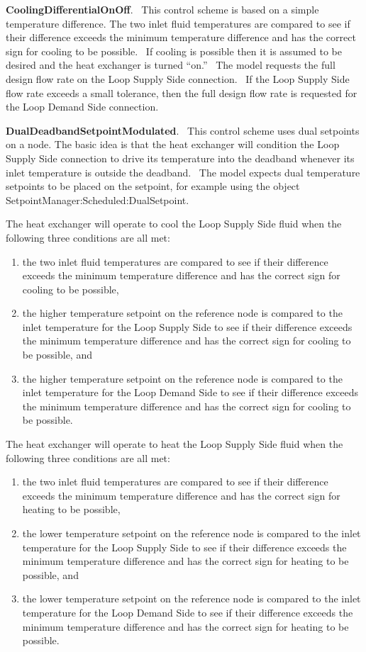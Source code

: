 \textbf{CoolingDifferentialOnOff}.~ This control scheme is based on a simple temperature difference. The two inlet fluid temperatures are compared to see if their difference exceeds the minimum temperature difference and has the correct sign for cooling to be possible.~ If cooling is possible then it is assumed to be desired and the heat exchanger is turned ``on.''~ The model requests the full design flow rate on the Loop Supply Side connection.~ If the Loop Supply Side flow rate exceeds a small tolerance, then the full design flow rate is requested for the Loop Demand Side connection.

\textbf{DualDeadbandSetpointModulated}.~ This control scheme uses dual setpoints on a node. The basic idea is that the heat exchanger will condition the Loop Supply Side connection to drive its temperature into the deadband whenever its inlet temperature is outside the deadband.~ The model expects dual temperature setpoints to be placed on the setpoint, for example using the object SetpointManager:Scheduled:DualSetpoint.

The heat exchanger will operate to cool the Loop Supply Side fluid when the following three conditions are all met:

\begin{enumerate}
\def\labelenumi{\arabic{enumi})}
\tightlist
\item the two inlet fluid temperatures are compared to see if their difference exceeds the minimum temperature difference and has the correct sign for cooling to be possible,
\item the higher temperature setpoint on the reference node is compared to the inlet temperature for the Loop Supply Side to see if their difference exceeds the minimum temperature difference and has the correct sign for cooling to be possible, and
\item the higher temperature setpoint on the reference node is compared to the inlet temperature for the Loop Demand Side to see if their difference exceeds the minimum temperature difference and has the correct sign for cooling to be possible.
\end{enumerate}

The heat exchanger will operate to heat the Loop Supply Side fluid when the following three conditions are all met:

\begin{enumerate}
\def\labelenumi{\arabic{enumi})}
\tightlist
\item the two inlet fluid temperatures are compared to see if their difference exceeds the minimum temperature difference and has the correct sign for heating to be possible,
\item the lower temperature setpoint on the reference node is compared to the inlet temperature for the Loop Supply Side to see if their difference exceeds the minimum temperature difference and has the correct sign for heating to be possible, and
\item the lower temperature setpoint on the reference node is compared to the inlet temperature for the Loop Demand Side to see if their difference exceeds the minimum temperature difference and has the correct sign for heating to be possible.
\end{enumerate}

